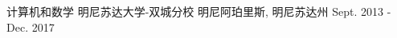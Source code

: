 

\begin{cventries}

  \cventry
    {计算机和数学} %
    {明尼苏达大学-双城分校} %
    {明尼阿珀里斯, 明尼苏达州} %
    {Sept. 2013 - Dec. 2017} %
    {
    }

\end{cventries}

